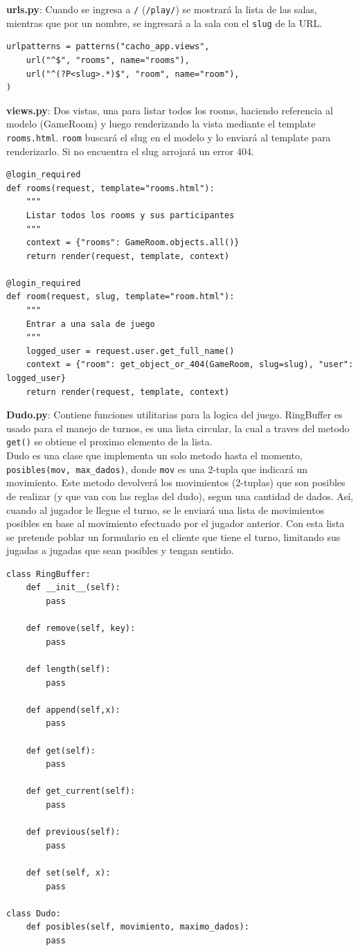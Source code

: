 \documentclass[a4paper,11pt]{article}
\begin{document}
\textbf{urls.py}: Cuando se ingresa a \texttt{/} (\texttt{/play/}) se mostrará
la lista de las salas, mientras que por un nombre, se ingresará a la sala con el
\texttt{slug} de la URL.
\begin{lstlisting}[caption=cacho\_app/urls.py]
urlpatterns = patterns("cacho_app.views",
	url("^$", "rooms", name="rooms"),
	url("^(?P<slug>.*)$", "room", name="room"),
)
\end{lstlisting}
\vspace{1cm}
\textbf{views.py}: Dos vistas, una para listar todos los rooms, haciendo
referencia al modelo (GameRoom) y luego renderizando la vista mediante el template
\texttt{rooms.html}. \texttt{room} buscará el slug en el modelo y lo enviará al template
para renderizarlo. Si no encuentra el slug arrojará un error 404.
\begin{lstlisting}[caption=cacho\_app/views.py]
@login_required
def rooms(request, template="rooms.html"):
    """
    Listar todos los rooms y sus participantes
    """
    context = {"rooms": GameRoom.objects.all()}
    return render(request, template, context)

@login_required
def room(request, slug, template="room.html"):
    """
    Entrar a una sala de juego
    """
    logged_user = request.user.get_full_name()
    context = {"room": get_object_or_404(GameRoom, slug=slug), "user": logged_user}
    return render(request, template, context)
\end{lstlisting}
\newpage
\textbf{Dudo.py}: Contiene funciones utilitarias para la logica del juego.
RingBuffer es usado para el manejo de turnos, es una lista circular, la cual a traves
del metodo \texttt{get()} se obtiene el proximo elemento de la lista.\\

Dudo es una clase que implementa un solo metodo hasta el momento, \texttt{posibles(mov, max\_dados)}, donde \texttt{mov} es una 2-tupla que indicará un movimiento. Este metodo devolverá
los movimientos (2-tuplas) que son posibles de realizar (y que van con las reglas del dudo), segun una cantidad de dados. Así, cuando al jugador le llegue el turno, se le enviará una lista de movimientos posibles en base al movimiento efectuado por el jugador anterior. Con esta lista se pretende poblar un formulario en el cliente que tiene el turno, limitando sus jugadas a jugadas que sean posibles y tengan sentido.
\begin{lstlisting}[caption=Dudo.py]
class RingBuffer:
	def __init__(self):
		pass
		
	def remove(self, key):
		pass
		
	def length(self):
		pass
		
	def append(self,x):
		pass
		
	def get(self):
		pass
		
	def get_current(self):
		pass
		
	def previous(self):
		pass
		
	def set(self, x):
		pass
		
class Dudo:
	def posibles(self, movimiento, maximo_dados):
		pass
\end{lstlisting}
\end{document}
